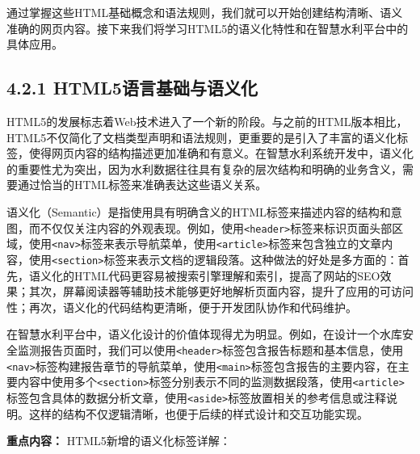通过掌握这些HTML基础概念和语法规则，我们就可以开始创建结构清晰、语义准确的网页内容。接下来我们将学习HTML5的语义化特性和在智慧水利平台中的具体应用。

\subsection{4.2.1 HTML5语言基础与语义化}\label{html5ux8bedux8a00ux57faux7840ux4e0eux8bedux4e49ux5316}

HTML5的发展标志着Web技术进入了一个新的阶段。与之前的HTML版本相比，HTML5不仅简化了文档类型声明和语法规则，更重要的是引入了丰富的语义化标签，使得网页内容的结构描述更加准确和有意义。在智慧水利系统开发中，语义化的重要性尤为突出，因为水利数据往往具有复杂的层次结构和明确的业务含义，需要通过恰当的HTML标签来准确表达这些语义关系。

语义化（Semantic）是指使用具有明确含义的HTML标签来描述内容的结构和意图，而不仅仅关注内容的外观表现。例如，使用\texttt{\textless{}header\textgreater{}}标签来标识页面头部区域，使用\texttt{\textless{}nav\textgreater{}}标签来表示导航菜单，使用\texttt{\textless{}article\textgreater{}}标签来包含独立的文章内容，使用\texttt{\textless{}section\textgreater{}}标签来表示文档的逻辑段落。这种做法的好处是多方面的：首先，语义化的HTML代码更容易被搜索引擎理解和索引，提高了网站的SEO效果；其次，屏幕阅读器等辅助技术能够更好地解析页面内容，提升了应用的可访问性；再次，语义化的代码结构更清晰，便于开发团队协作和代码维护。

在智慧水利平台中，语义化设计的价值体现得尤为明显。例如，在设计一个水库安全监测报告页面时，我们可以使用\texttt{\textless{}header\textgreater{}}标签包含报告标题和基本信息，使用\texttt{\textless{}nav\textgreater{}}标签构建报告章节的导航菜单，使用\texttt{\textless{}main\textgreater{}}标签包含报告的主要内容，在主要内容中使用多个\texttt{\textless{}section\textgreater{}}标签分别表示不同的监测数据段落，使用\texttt{\textless{}article\textgreater{}}标签包含具体的数据分析文章，使用\texttt{\textless{}aside\textgreater{}}标签放置相关的参考信息或注释说明。这样的结构不仅逻辑清晰，也便于后续的样式设计和交互功能实现。

\textbf{重点内容：} HTML5新增的语义化标签详解：

